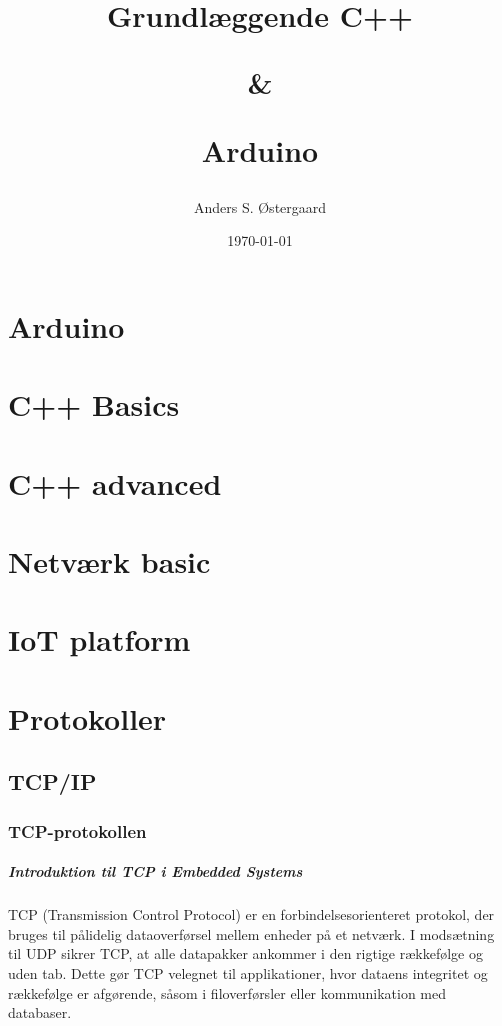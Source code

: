 \documentclass[12pt,a4paper]{book}
\title{Grundlæggende C++ \par\&\par Arduino}
\author{Anders S. Østergaard}
\date{\today}
\begin{document}
	
	\maketitle
	\clearpage
	\tableofcontents
	\clearpage
	\part{Arduino}
	
	
	\part{C++ Basics}
	
	
	
	\part{C++ advanced}
	
	
	\part{Netværk basic}
	
	
	\part{IoT platform}
	
	
	
	\part{Protokoller}
	\chapter{TCP/IP}
	\section{TCP-protokollen}
	\subsubsection*{Introduktion til TCP i Embedded Systems}
	TCP (Transmission Control Protocol) er en forbindelsesorienteret protokol, der bruges til pålidelig dataoverførsel mellem enheder på et netværk. I modsætning til UDP sikrer TCP, at alle datapakker ankommer i den rigtige rækkefølge og uden tab. Dette gør TCP velegnet til applikationer, hvor dataens integritet og rækkefølge er afgørende, såsom i filoverførsler eller kommunikation med databaser.
	
\end{document}
